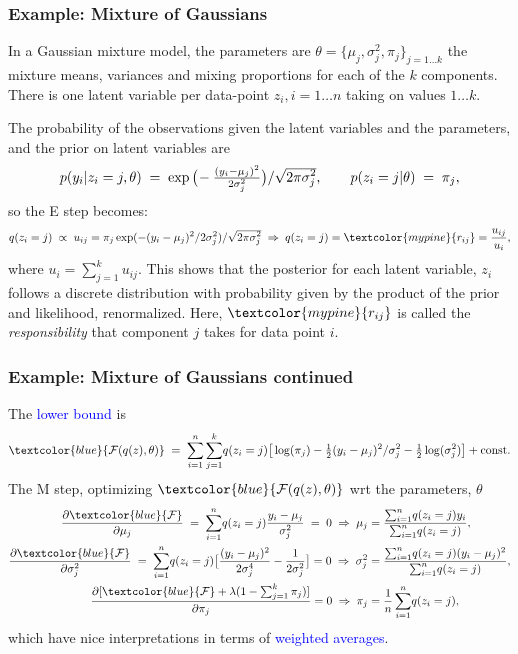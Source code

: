 \documentclass[10pt]{beamer}
\newcommand{\Blue}{\textcolor{blue}}
\newcommand{\Green}{\textcolor{mypine}}
\newcommand{\y}{y}
\newcommand{\z}{z}
\begin{document}
\begin{frame}
\frametitle{Example: Mixture of Gaussians}

In a Gaussian mixture model, the parameters are $\theta=\{\mu_j,\sigma_j^2,\pi_j\}_{j=1\ldots k}$ the mixture
means, variances and mixing proportions for each of the $k$ components. There is one latent variable per data-point $\z_i, i=1\ldots n$ taking on values $1\ldots k$.

The probability of the observations given the latent variables and the parameters, and the prior on latent variables are
\[
p(y_i|\z_i=j,\theta)\;=\;
\exp\big(\!-\tfrac{(y_i-\mu_j)^2}{2\sigma^2_j}\big)/\sqrt{2\pi\smash{\sigma^2_j}},\qquad p(\z_i=j|\theta)\;=\;\pi_j,
\]
so the E step becomes:
\[
q(\z_i=j)\;\propto\;u_{ij}=\pi_j\exp(-(y_i-\mu_j)^2/2\sigma^2_j)/\sqrt{2\pi\smash{\sigma_j^2}}
\;\Rightarrow\;q(\z_i=j)=\Green{r_{ij}}=\frac{u_{ij}}{u_i},
\]
where $u_i=\sum_{j=1}^ku_{ij}$. This shows that the posterior for each latent variable, $\z_i$ follows a discrete distribution with probability given by the product of the prior and likelihood, renormalized. Here, $\Green{r_{ij}}$ is called the \emph{\Green{responsibility}} that component $j$ takes for data point $i$.
\end{frame}

\begin{frame}
\frametitle{Example: Mixture of Gaussians continued}

The \Blue{lower bound} is
\[
\Blue{{\cal F}(q(\z),\theta)}\;=\;\sum_{i=1}^n\sum_{j=1}^k\!q(\z_i=j)
\big[\log(\pi_j)-\tfrac{1}{2}(\y_i-\mu_j)^2/\sigma_j^2-\tfrac{1}{2}\log(\sigma_j^2)\big]+{\rm const}.
\]
The M step, optimizing $\Blue{{\cal F}(q(\z),\theta)}$ wrt the parameters, $\theta$
\[
\begin{split}
\frac{\partial\Blue{{\cal F}}}{\partial\mu_j}\;=\;
\sum_{i=1}^n\!q(\z_i=j)\frac{\y_i-\mu_j}{\sigma_j^2}\;=\;0\;\Rightarrow\;
\mu_j&=\frac{\sum_{i=1}^n\!q(\z_i=j)\y_i}{\sum_{i=1}^n\!q(\z_i=j)},\\
\frac{\partial\Blue{{\cal F}}}{\partial\sigma^2_j}\;=\;
\sum_{i=1}^n\!q(\z_i=j)\big[\frac{(\y_i-\mu_j)^2}{2\sigma_j^4}-\frac{1}{2\sigma_j^2}\big]=0
\;\Rightarrow\;\sigma_j^2&=\frac{\sum_{i=1}^n\!q(\z_i=j)(\y_i-\mu_j)^2}{\sum_{i=1}^n\!q(\z_i=j)},\\
\frac{\partial[\Blue{{\cal F}}+\lambda(1-\sum_{j=1}^k\pi_j)]}{\partial\pi_j}=0
\;\Rightarrow\;\pi_j&=\frac{1}{n}\sum_{i=1}^n\!q(\z_i=j),
\end{split}
\]
%
which have nice interpretations in terms of \Blue{weighted averages}.
\end{frame}
\end{document}
